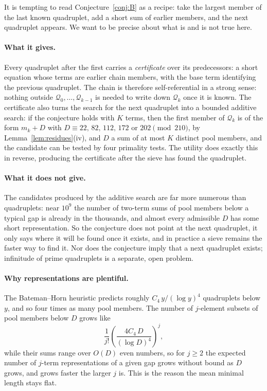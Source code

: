 \documentclass[11pt,a4paper]{article}
\newcommand{\Q}{\mathcal{Q}}
\begin{document}
It is tempting to read Conjecture~\ref{conj:B} as a recipe: take the
largest member of the last known quadruplet, add a short sum of earlier
members, and the next quadruplet appears. We want to be precise about what
is and is not true here.

\paragraph{What it gives.}
Every quadruplet after the first carries a \emph{certificate} over its
predecessors: a short equation whose terms are earlier chain members, with
the base term identifying the previous quadruplet. The chain is therefore
self-referential in a strong sense: nothing outside $\Q_0,\dots,\Q_{k-1}$
is needed to write down $\Q_k$ once it is known. The certificate also
turns the search for the next quadruplet into a bounded additive search:
if the conjecture holds with $K$ terms, then the first member of $\Q_k$ is
of the form $m_k+D$ with $D\equiv 22,\,82,\,112,\,172$ or
$202 \pmod{210}$, by Lemma~\ref{lem:residues}(iv), and $D$ a sum of at most
$K$ distinct pool members, and the candidate can be tested by four
primality tests. The utility does exactly this in reverse, producing the
certificate after the sieve has found the quadruplet.

\paragraph{What it does not give.}
The candidates produced by the additive search are far more numerous than
quadruplets: near $10^9$ the number of two-term sums of pool members below
a typical gap is already in the thousands, and almost every admissible $D$
has some short representation. So the conjecture does not point at the
next quadruplet, it only says where it will be found once it exists, and
in practice a sieve remains the faster way to find it. Nor does the
conjecture imply that a next quadruplet exists; infinitude of prime
quadruplets is a separate, open problem.

\paragraph{Why representations are plentiful.}
The Bateman--Horn heuristic predicts roughly $C_4\,y/(\log y)^4$
quadruplets below $y$, and so four times as many pool members. The number
of $j$-element subsets of pool members below $D$ grows like
\[
\frac{1}{j!}\left(\frac{4C_4\,D}{(\log D)^4}\right)^{j},
\]
while their sums range over $O(D)$ even numbers, so for $j\ge2$ the
expected number of $j$-term representations of a given gap grows without
bound as $D$ grows, and grows faster the larger $j$ is. This is the reason the mean minimal length stays flat.
\end{document}
